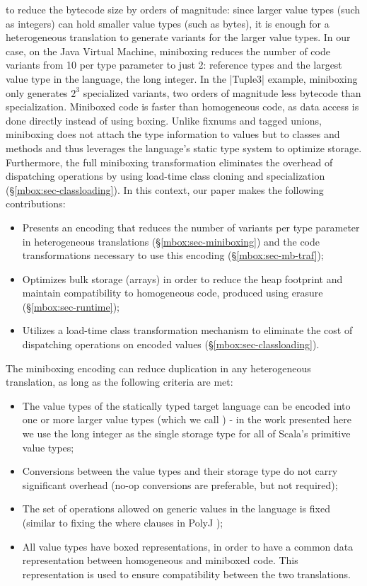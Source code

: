  to reduce the bytecode size by orders of magnitude: since larger value types (such as integers) can hold smaller value types (such as bytes), it is enough for a heterogeneous translation to generate variants for the larger value types. In our case, on the Java Virtual Machine, miniboxing reduces the number of code variants from 10 per type parameter to just 2: reference types and the largest value type in the language, the long integer. In the |Tuple3| example, miniboxing only generates $2^3$ specialized variants, two orders of magnitude less bytecode than specialization. Miniboxed code is faster than homogeneous code, as data access is done directly instead of using boxing. Unlike fixnums and tagged unions, miniboxing does not attach the type information to values but to classes and methods and thus leverages the language's static type system to optimize storage. Furthermore, the full miniboxing transformation eliminates the overhead of dispatching operations by using load-time class cloning and specialization (\S\ref{mbox:sec-classloading}). In this context, our paper makes the following contributions:  

\begin{itemize}
  \item Presents an encoding that reduces the number of variants per type parameter in heterogeneous translations (\S{}\ref{mbox:sec-miniboxing}) and the code transformations necessary to use this encoding (\S\ref{mbox:sec-mb-traf});
  \item Optimizes bulk storage (arrays) in order to reduce the heap footprint and maintain compatibility to homogeneous code, produced using erasure (\S{}\ref{mbox:sec-runtime});
  \item Utilizes a load-time class transformation mechanism to eliminate the cost of dispatching operations on encoded values (\S{}\ref{mbox:sec-classloading}).
\end{itemize}  

The miniboxing encoding can reduce duplication in any heterogeneous translation, as long as the following criteria are met:
\begin{itemize}
  \item The value types of the statically typed target language can be encoded into one or more larger value types (which we call ) - in the work presented here we use the long integer as the single storage type for all of Scala's primitive value types;
  \item Conversions between the value types and their storage type do not carry significant overhead (no-op conversions are preferable, but not required);
  \item The set of operations allowed on generic values in the language is fixed (similar to fixing the where clauses in PolyJ \cite{myers-polyj});
  \item All value types have boxed representations, in order to have a common data representation between homogeneous and miniboxed code. This representation is used to ensure compatibility between the two translations.
\end{itemize}

